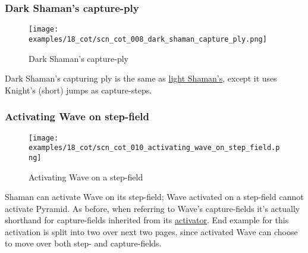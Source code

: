 \vspace*{-1.4\baselineskip}
\subsubsection*{Dark Shaman's capture-ply}
\label{sec:Conquest of Tlalocan/Shaman/Movement/Dark Shaman's capture-ply}

\vspace*{-1.4\baselineskip}
\noindent
\begin{figure}[!h]
\texttt{[image: examples/18\_cot/scn\_cot\_008\_dark\_shaman\_capture\_ply.png]}
\vspace*{-1.4\baselineskip}
\caption{Dark Shaman's capture-ply}
\label{fig:scn_cot_008_dark_shaman_capture_ply}
\end{figure}

\vspace*{-0.4\baselineskip}
Dark Shaman's capturing ply is the same as
\hyperref[fig:scn_cot_004_light_shaman_capture_ply]{light Shaman's}, except it uses
Knight's (short) jumps as capture-steps.

\clearpage %

\subsubsection*{Activating Wave on step-field}
\label{sec:Conquest of Tlalocan/Shaman/Movement/Activating Wave on step-field}

\vspace*{-1.4\baselineskip}
\noindent
\begin{figure}[!h]
\texttt{[image: examples/18\_cot/scn\_cot\_010\_activating\_wave\_on\_step\_field.png]}
\vspace*{-1.4\baselineskip}
\caption{Activating Wave on a step-field}
\label{fig:scn_cot_010_activating_wave_on_step_field}
\end{figure}

\vspace*{-0.5\baselineskip}
Shaman can activate Wave on its step-field; Wave activated on a step-field cannot
activate Pyramid.\newline
\indent
As before, when referring to Wave's capture-fields it's actually shorthand for
capture-fields inherited from its \hyperref[sec:Terms/Activator]{activator}.\newline
\indent
End example for this activation is split into two over next two pages, since
activated Wave can choose to move over both step- and capture-fields.

